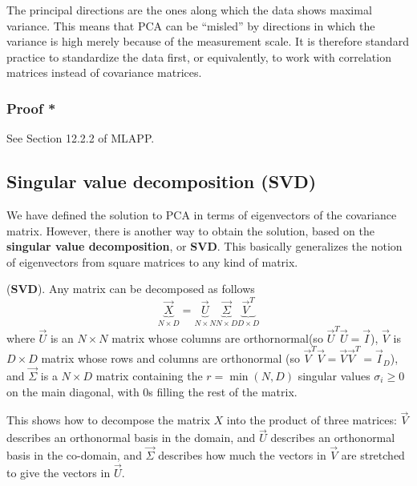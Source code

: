 The principal directions are the ones along which the data shows maximal variance. This means that PCA can be “misled” by directions in which the variance is high merely because of the measurement scale. It is therefore standard practice to standardize the data first, or equivalently, to work with correlation matrices instead of covariance matrices. 


\subsubsection{Proof *}
See Section 12.2.2 of MLAPP.


\subsection{Singular value decomposition (SVD)}
We have defined the solution to PCA in terms of eigenvectors of the covariance matrix. However, there is another way to obtain the solution, based on the \textbf{singular value decomposition}, or \textbf{SVD}. This basically generalizes the notion of eigenvectors from square matrices to any kind of matrix.

\begin{theorem}(\textbf{SVD}).
Any matrix can be decomposed as follows
\begin{equation}\label{eqn:SVD}
\underbrace{\vec{X}}_{N \times D}=\underbrace{\vec{U}}_{N \times N}\underbrace{\vec{\Sigma}}_{N \times D}\underbrace{\vec{V}^T}_{D \times D}
\end{equation}
where $\vec{U}$ is an $N \times N$ matrix whose columns are orthornormal(so $\vec{U}^T\vec{U}=\vec{I}$), $\vec{V}$ is $D \times D$ matrix whose rows and columns are orthonormal (so $\vec{V}^T\vec{V}=\vec{V}\vec{V}^T=\vec{I}_D$), and $\vec{\Sigma}$ is a $N \times D$ matrix containing the $r=\min(N,D)$ singular values $\sigma_i \geq 0$ on the main diagonal, with 0s filling the rest of the matrix.
\end{theorem}

This shows how to decompose the matrix $X$ into the product of three matrices: $\vec{V}$ describes an orthonormal basis in the domain, and $\vec{U}$ describes an orthonormal basis in the co-domain, and $\vec{\Sigma}$ describes how much the vectors in $\vec{V}$ are stretched to give the vectors in $\vec{U}$.


